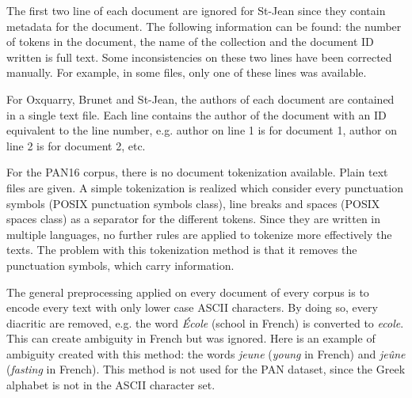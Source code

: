 The first two line of each document are ignored for St-Jean since they contain metadata for the document.
The following information can be found: the number of tokens in the document, the name of the collection and the document ID written is full text.
Some inconsistencies on these two lines have been corrected manually.
For example, in some files, only one of these lines was available.

For Oxquarry, Brunet and St-Jean, the authors of each document are contained in a single text file.
Each line contains the author of the document with an ID equivalent to the line number, e.g. author on line 1 is for document 1, author on line 2 is for document 2, etc.

For the PAN16 corpus, there is no document tokenization available.
Plain text files are given.
A simple tokenization is realized which consider every punctuation symbols (POSIX punctuation symbols class), line breaks and spaces (POSIX spaces class) as a separator for the different tokens.
Since they are written in multiple languages, no further rules are applied to tokenize more effectively the texts.
The problem with this tokenization method is that it removes the punctuation symbols, which carry information.

The general preprocessing applied on every document of every corpus is to encode every text with only lower case ASCII characters.
By doing so, every diacritic are removed, e.g. the word \textit{École} (school in French) is converted to \textit{ecole}.
This can create ambiguity in French but was ignored.
Here is an example of ambiguity created with this method: the words \textit{jeune} (\textit{young} in French) and \textit{jeûne} (\textit{fasting} in French).
This method is not used for the PAN dataset, since the Greek alphabet is not in the ASCII character set.
